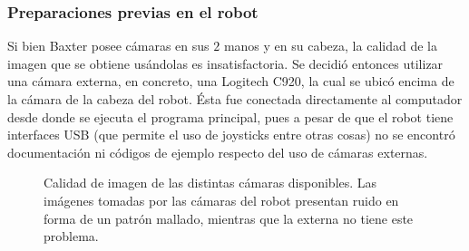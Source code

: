\subsubsection{Preparaciones previas en el robot}
Si bien Baxter posee cámaras en sus $2$ manos y en su cabeza, la calidad de la imagen que se obtiene usándolas es insatisfactoria. Se decidió entonces utilizar una cámara externa, en concreto, una Logitech C920\cite{logitech}, la cual se ubicó encima de la cámara de la cabeza del robot. Ésta fue conectada directamente al computador desde donde se ejecuta el programa principal, pues a pesar de que el robot tiene interfaces USB (que permite el uso de joysticks entre otras cosas) no se encontró documentación ni códigos de ejemplo respecto del uso de cámaras externas.
\begin{figure}[h!]
	\centering
	\hfill
	\hfill
	\hfill
	\caption[Calidad de imagen de las distintas cámaras disponibles.]{Calidad de imagen de las distintas cámaras disponibles. Las imágenes tomadas por las cámaras del robot presentan ruido en forma de un patrón mallado, mientras que la externa no tiene este problema.}
	\label{camaras}
\end{figure}

